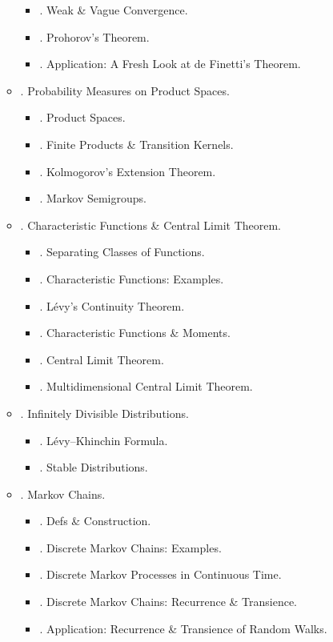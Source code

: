 \documentclass{article}
\begin{document}
\begin{enumerate}
\begin{itemize}
\begin{itemize}
			\item {. Weak \& Vague Convergence.}
			\item {. Prohorov's Theorem.}
			\item {. Application: A Fresh Look at de Finetti's Theorem.}
		\end{itemize}
		\item {. Probability Measures on Product Spaces.}
		\begin{itemize}
			\item {. Product Spaces.}
			\item {. Finite Products \& Transition Kernels.}
			\item {. Kolmogorov's Extension Theorem.}
			\item {. Markov Semigroups.}
		\end{itemize}
		\item {. Characteristic Functions \& Central Limit Theorem.}
		\begin{itemize}
			\item {. Separating Classes of Functions.}
			\item {. Characteristic Functions: Examples.}
			\item {. L\'evy's Continuity Theorem.}
			\item {. Characteristic Functions \& Moments.}
			\item {. Central Limit Theorem.}
			\item {. Multidimensional Central Limit Theorem.}
		\end{itemize}
		\item {. Infinitely Divisible Distributions.}
		\begin{itemize}
			\item {. L\'evy--Khinchin Formula.}
			\item {. Stable Distributions.}
		\end{itemize}
		\item {. Markov Chains.}
		\begin{itemize}
			\item {. Defs \& Construction.}
			\item {. Discrete Markov Chains: Examples.}
			\item {. Discrete Markov Processes in Continuous Time.}
			\item {. Discrete Markov Chains: Recurrence \& Transience.}
			\item {. Application: Recurrence \& Transience of Random Walks.}

\end{itemize}
\end{itemize}
\end{enumerate}
\end{document}
